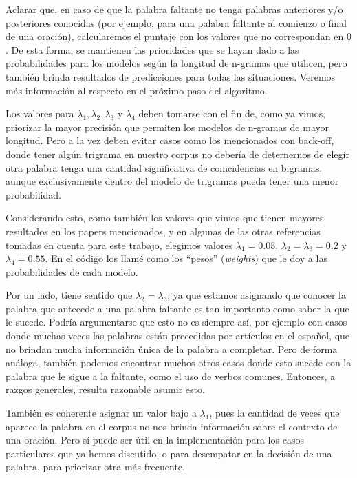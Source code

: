 \documentclass[a4paper]{article}
\begin{document}
\begin{enumerate}
        Aclarar que, en caso de que la palabra faltante no tenga palabras anteriores y/o posteriores conocidas (por ejemplo, para una palabra faltante al comienzo o final de una oración), calcularemos el puntaje con los valores que no correspondan en $0$. De esta forma, se mantienen las prioridades que se hayan dado a las probabilidades para los modelos según la longitud de n-gramas que utilicen, pero también brinda resultados de predicciones para todas las situaciones. Veremos más información al respecto en el próximo paso del algoritmo.

        Los valores para $\lambda_1, \lambda_2, \lambda_3$ y $\lambda_4$ deben tomarse con el fin de, como ya vimos, priorizar la mayor precisión que permiten los modelos de n-gramas de mayor longitud. Pero a la vez deben evitar casos como los mencionados con back-off, donde tener algún trigrama en nuestro corpus no debería de deternernos de elegir otra palabra tenga una cantidad significativa de coincidencias en bigramas, aunque exclusivamente dentro del modelo de trigramas pueda tener una menor probabilidad.

        Considerando esto, como también los valores que vimos que tienen mayores resultados en los papers mencionados\cite{Bhuyan2020}\cite{Samanta2013ASR}, y en algunas de las otras referencias tomadas en cuenta para este trabajo\cite{TdsGen}, elegimos valores $\lambda_1 = 0.05$, $\lambda_2 = \lambda_3 = 0.2$ y $\lambda_4 = 0.55$. En el código los llamé como los ``pesos'' (\textit{weights}) que le doy a las probabilidades de cada modelo.

        Por un lado, tiene sentido que $\lambda_2 = \lambda_3$, ya que estamos asignando que conocer la palabra que antecede a una palabra faltante es tan importanto como saber la que le sucede. Podría argumentarse que esto no es siempre así, por ejemplo con casos donde muchas veces las palabras están precedidas por artículos en el español, que no brindan mucha información única de la palabra a completar. Pero de forma análoga, también podemos encontrar muchos otros casos donde esto sucede con la palabra que le sigue a la faltante, como el uso de verbos comunes. Entonces, a razgos generales, resulta razonable asumir esto.

        También es coherente asignar un valor bajo a $\lambda_1$, pues la cantidad de veces que aparece la palabra en el corpus no nos brinda información sobre el contexto de una oración. Pero sí puede ser útil en la implementación para los casos particulares que ya hemos discutido, o para desempatar en la decisión de una palabra, para priorizar otra más frecuente.


\end{enumerate}
\end{document}
